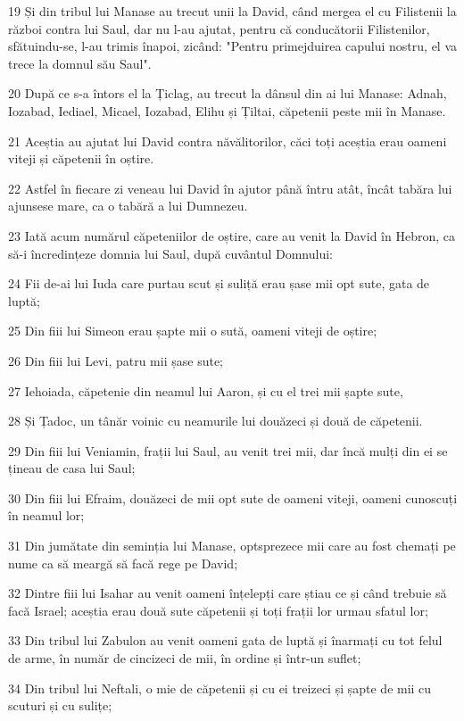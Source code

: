 \par 19 Și din tribul lui Manase au trecut unii la David, când mergea el cu Filistenii la război contra lui Saul, dar nu l-au ajutat, pentru că conducătorii Filistenilor, sfătuindu-se, l-au trimis înapoi, zicând: "Pentru primejduirea capului nostru, el va trece la domnul său Saul".
\par 20 După ce s-a întors el la Țiclag, au trecut la dânsul din ai lui Manase: Adnah, Iozabad, Iediael, Micael, Iozabad, Elihu și Țiltai, căpetenii peste mii în Manase.
\par 21 Aceștia au ajutat lui David contra năvălitorilor, căci toți aceștia erau oameni viteji și căpetenii în oștire.
\par 22 Astfel în fiecare zi veneau lui David în ajutor până întru atât, încât tabăra lui ajunsese mare, ca o tabără a lui Dumnezeu.
\par 23 Iată acum numărul căpeteniilor de oștire, care au venit la David în Hebron, ca să-i încredințeze domnia lui Saul, după cuvântul Domnului:
\par 24 Fii de-ai lui Iuda care purtau scut și suliță erau șase mii opt sute, gata de luptă;
\par 25 Din fiii lui Simeon erau șapte mii o sută, oameni viteji de oștire;
\par 26 Din fiii lui Levi, patru mii șase sute;
\par 27 Iehoiada, căpetenie din neamul lui Aaron, și cu el trei mii șapte sute,
\par 28 Și Țadoc, un tânăr voinic cu neamurile lui douăzeci și două de căpetenii.
\par 29 Din fiii lui Veniamin, frații lui Saul, au venit trei mii, dar încă mulți din ei se țineau de casa lui Saul;
\par 30 Din fiii lui Efraim, douăzeci de mii opt sute de oameni viteji, oameni cunoscuți în neamul lor;
\par 31 Din jumătate din seminția lui Manase, optsprezece mii care au fost chemați pe nume ca să meargă să facă rege pe David;
\par 32 Dintre fiii lui Isahar au venit oameni înțelepți care știau ce și când trebuie să facă Israel; aceștia erau două sute căpetenii și toți frații lor urmau sfatul lor;
\par 33 Din tribul lui Zabulon au venit oameni gata de luptă și înarmați cu tot felul de arme, în număr de cincizeci de mii, în ordine și într-un suflet;
\par 34 Din tribul lui Neftali, o mie de căpetenii și cu ei treizeci și șapte de mii cu scuturi și cu sulițe;
